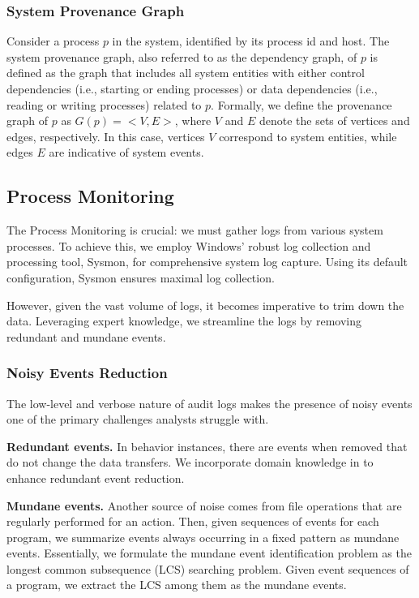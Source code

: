 \subsubsection{System Provenance Graph}
Consider a process $p$ in the system, identified by its process id and host. The system provenance graph, also referred to as the dependency graph, of $p$ is defined as the graph that includes all system entities with either control dependencies (i.e., starting or ending processes) or data dependencies (i.e., reading or writing processes) related to $p$. Formally, we define the provenance graph of $p$ as $G(p) =< V, E >$, where $V$ and $E$ denote the sets of vertices and edges, respectively. In this case, vertices $V$ correspond to system entities, while edges $E$ are indicative of system events.


\subsection{Process Monitoring}

The Process Monitoring is crucial: we must gather logs from various system processes. To achieve this, we employ Windows' robust log collection and processing tool, Sysmon, for comprehensive system log capture. Using its default configuration, Sysmon ensures maximal log collection. 

However, given the vast volume of logs, it becomes imperative to trim down the data. Leveraging expert knowledge, we streamline the logs by removing redundant and mundane events.
\subsubsection{Noisy Events Reduction}
The low-level and verbose nature of audit logs makes the presence of noisy events one of the primary challenges analysts struggle with.

\textbf{Redundant events.}
In behavior instances, there are events when removed that do not change the data transfers. We incorporate domain knowledge in to enhance redundant event reduction.

\textbf{Mundane events.}
Another source of noise comes from ﬁle operations that are regularly performed for an action.
Then, given sequences of events for each program, we summarize events always occurring in a ﬁxed pattern as mundane events. Essentially, we formulate the mundane event identiﬁcation problem as the longest common subsequence (LCS) searching problem. Given event sequences of a program, we extract the LCS among them as the mundane events.

